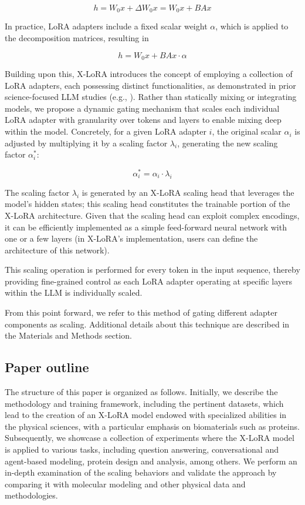 \begin{equation}
    h = W_0x + \Delta W_0x = W_0x + BAx
\end{equation}

In practice, LoRA adapters include a fixed scalar weight $\alpha$, which is applied to the decomposition matrices, resulting in

\begin{equation}
    h = W_0x + BAx \cdot \alpha
\end{equation}

Building upon this, X-LoRA introduces the concept of employing a collection of LoRA adapters, each possessing distinct functionalities, as demonstrated in prior science-focused LLM studies (e.g., \cite{Buehler2023GenerativeDesign}). Rather than statically mixing or integrating models, we propose a dynamic gating mechanism that scales each individual LoRA adapter with granularity over tokens and layers to enable mixing deep within the model. Concretely, for a given LoRA adapter $i$, the original scalar $\alpha_i$ is adjusted by multiplying it by a scaling factor $\lambda_i$, generating the new scaling factor $\alpha^*_i$:

\begin{equation}
    \alpha^*_i = \alpha_i \cdot \lambda_i
\end{equation}

The scaling factor $\lambda_i$ is generated by an X-LoRA scaling head that leverages the model's hidden states; this scaling head constitutes the trainable portion of the X-LoRA architecture. Given that the scaling head can exploit complex encodings, it can be efficiently implemented as a simple feed-forward neural network with one or a few layers (in X-LoRA’s implementation, users can define the architecture of this network).

This scaling operation is performed for every token in the input sequence, thereby providing fine-grained control as each LoRA adapter operating at specific layers within the LLM is individually scaled.

From this point forward, we refer to this method of gating different adapter components as scaling. Additional details about this technique are described in the Materials and Methods section.

\subsection{Paper outline}

The structure of this paper is organized as follows. Initially, we describe the methodology and training framework, including the pertinent datasets, which lead to the creation of an X-LoRA model endowed with specialized abilities in the physical sciences, with a particular emphasis on biomaterials such as proteins. Subsequently, we showcase a collection of experiments where the X-LoRA model is applied to various tasks, including question answering, conversational and agent-based modeling, protein design and analysis, among others. We perform an in-depth examination of the scaling behaviors and validate the approach by comparing it with molecular modeling and other physical data and methodologies.

